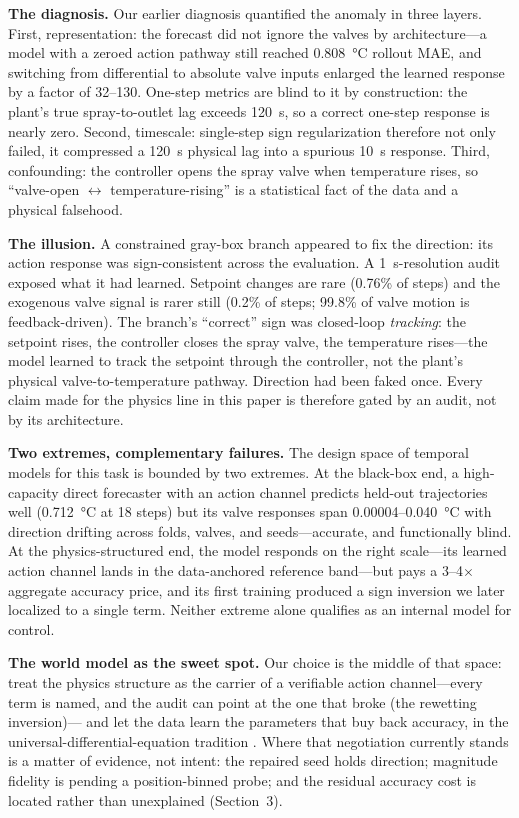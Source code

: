 \documentclass{article}
\begin{document}
\textbf{The diagnosis.} Our earlier diagnosis quantified the anomaly in three layers.
First, representation: the forecast did not ignore the valves by architecture---a
model with a zeroed action pathway still reached 0.808~\si{\degreeCelsius} rollout
MAE, and switching from differential to absolute valve inputs enlarged the learned
response by a factor of 32--130. One-step metrics are blind to it by construction: the
plant's true spray-to-outlet lag exceeds 120~s, so a correct one-step response is
nearly zero. Second, timescale: single-step sign regularization therefore not only
failed, it compressed a 120~s physical lag into a spurious 10~s response. Third,
confounding: the controller opens the spray valve when temperature rises, so
``valve-open $\leftrightarrow$ temperature-rising'' is a statistical fact of the data
and a physical falsehood.

\textbf{The illusion.} A constrained gray-box branch appeared to fix the direction:
its action response was sign-consistent across the evaluation. A 1~s-resolution audit
exposed what it had learned. Setpoint changes are rare (0.76\% of steps) and the
exogenous valve signal is rarer still (0.2\% of steps; 99.8\% of valve motion is
feedback-driven). The branch's ``correct'' sign was closed-loop \emph{tracking}: the
setpoint rises, the controller closes the spray valve, the temperature rises---the
model learned to track the setpoint through the controller, not the plant's physical
valve-to-temperature pathway. Direction had been faked once. Every claim made for the
physics line in this paper is therefore gated by an audit, not by its architecture.

\textbf{Two extremes, complementary failures.} The design space of temporal models
for this task is bounded by two extremes. At the black-box end, a high-capacity direct
forecaster with an action channel predicts held-out trajectories well (0.712~\si{\degreeCelsius}
at 18 steps) but its valve responses span 0.00004--0.040~\si{\degreeCelsius} with
direction drifting across folds, valves, and seeds---accurate, and functionally blind.
At the physics-structured end, the model responds on the right scale---its learned
action channel lands in the data-anchored reference band---but pays a 3--4$\times$
aggregate accuracy price, and its first training produced a sign inversion we later
localized to a single term. Neither extreme alone qualifies as an internal model for
control.

\textbf{The world model as the sweet spot.} Our choice is the middle of that space:
treat the physics structure as the carrier of a verifiable action channel---every term
is named, and the audit can point at the one that broke (the rewetting inversion)---
and let the data learn the parameters that buy back accuracy, in the
universal-differential-equation tradition \cite{chen2018neuralode, rackauckas2020ude}.
Where that negotiation currently stands is a matter of evidence, not intent: the
repaired seed holds direction; magnitude fidelity is pending a position-binned probe;
and the residual accuracy cost is located rather than unexplained (Section~3).
\end{document}

